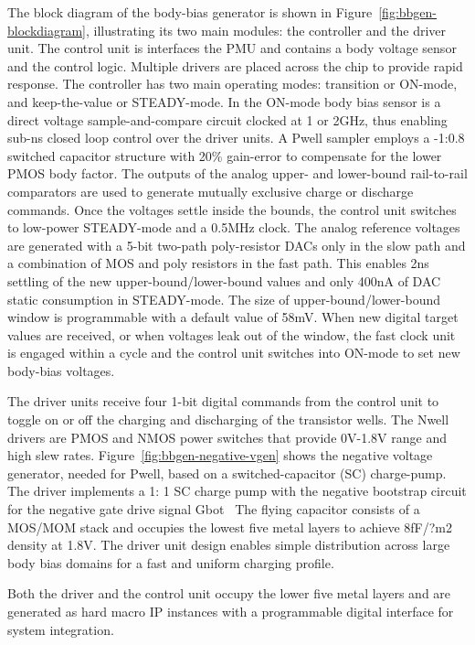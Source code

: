 \documentclass[graybox]{svmult}
\begin{document}
The block diagram of the body-bias generator is shown in Figure~\ref{fig:bbgen-blockdiagram}, illustrating its two main modules: the controller and the driver unit.
The control unit is interfaces the PMU and contains a body voltage sensor and the control logic.
Multiple drivers are placed across the chip to provide rapid response. 
The controller has two main operating modes: transition or ON-mode, and keep-the-value or STEADY-mode.
In the ON-mode body bias sensor is a direct voltage sample-and-compare circuit clocked at 1 or 2GHz, thus enabling sub-ns closed loop control over the driver units.
A Pwell sampler employs a -1:0.8 switched capacitor structure with 20\% gain-error to compensate for the lower PMOS body factor.
The outputs of the analog upper- and lower-bound rail-to-rail comparators are used to generate mutually exclusive charge or discharge commands.
Once the voltages settle inside the bounds, the control unit switches to low-power STEADY-mode and a 0.5MHz clock.
The analog reference voltages are generated with a 5-bit two-path poly-resistor DACs only in the slow path and a combination of MOS and poly resistors in the fast path.
This enables 2ns settling of the new upper-bound/lower-bound values and only 400nA of DAC static consumption in STEADY-mode.
The size of upper-bound/lower-bound window is programmable with a default value of 58mV.
When new digital target values are received, or when voltages leak out of the window, the fast clock unit is engaged within a cycle and the control unit switches into ON-mode to set new body-bias voltages.

The driver units receive four 1-bit digital commands from the control unit to toggle on or off the charging and discharging of the transistor wells. The Nwell drivers are PMOS and NMOS power switches that provide 0V-1.8V range and high slew rates.
Figure~\ref{fig:bbgen-negative-vgen} shows the negative voltage generator, needed for Pwell, based on a switched-capacitor (SC) charge-pump.
The driver implements a 1: 1 SC charge pump with the negative bootstrap circuit for the negative gate drive signal Gbot~\cite{Tsukikawa1993}
The flying capacitor consists of a MOS/MOM stack and occupies the lowest five metal layers to achieve 8fF/?m2 density at 1.8V.
The driver unit design enables simple distribution across large body bias domains for a fast and uniform charging profile.

Both the driver and the control unit occupy the lower five metal layers and are generated as hard macro IP instances with a programmable digital interface for system integration. 
\end{document}
